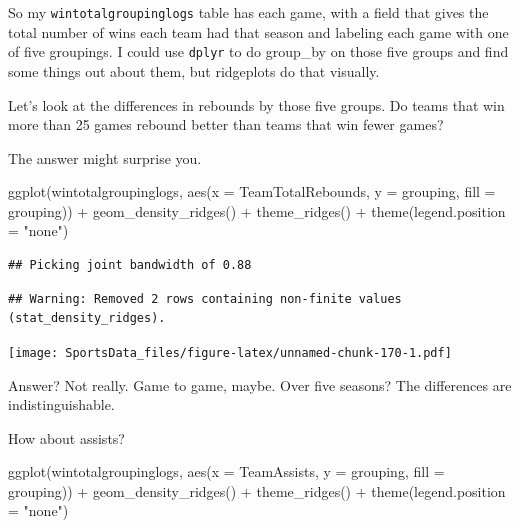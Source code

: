 \documentclass[
]{book}
\newenvironment{Shaded}{\begin{snugshade}}{\end{snugshade}}
\newcommand{\AttributeTok}[1]{\textcolor[rgb]{0.77,0.63,0.00}{#1}}
\newcommand{\FunctionTok}[1]{\textcolor[rgb]{0.00,0.00,0.00}{#1}}
\newcommand{\NormalTok}[1]{#1}
\newcommand{\SpecialCharTok}[1]{\textcolor[rgb]{0.00,0.00,0.00}{#1}}
\newcommand{\StringTok}[1]{\textcolor[rgb]{0.31,0.60,0.02}{#1}}
\begin{document}
So my \texttt{wintotalgroupinglogs} table has each game, with a field that gives the total number of wins each team had that season and labeling each game with one of five groupings. I could use \texttt{dplyr} to do group\_by on those five groups and find some things out about them, but ridgeplots do that visually.

Let's look at the differences in rebounds by those five groups. Do teams that win more than 25 games rebound better than teams that win fewer games?

The answer might surprise you.

\begin{Shaded}
\begin{Highlighting}[]
\FunctionTok{ggplot}\NormalTok{(wintotalgroupinglogs, }\FunctionTok{aes}\NormalTok{(}\AttributeTok{x =}\NormalTok{ TeamTotalRebounds, }\AttributeTok{y =}\NormalTok{ grouping, }\AttributeTok{fill =}\NormalTok{ grouping)) }\SpecialCharTok{+}
  \FunctionTok{geom\_density\_ridges}\NormalTok{() }\SpecialCharTok{+}
  \FunctionTok{theme\_ridges}\NormalTok{() }\SpecialCharTok{+} 
  \FunctionTok{theme}\NormalTok{(}\AttributeTok{legend.position =} \StringTok{"none"}\NormalTok{)}
\end{Highlighting}
\end{Shaded}

\begin{verbatim}
## Picking joint bandwidth of 0.88
\end{verbatim}

\begin{verbatim}
## Warning: Removed 2 rows containing non-finite values (stat_density_ridges).
\end{verbatim}

\texttt{[image: SportsData\_files/figure-latex/unnamed-chunk-170-1.pdf]}

Answer? Not really. Game to game, maybe. Over five seasons? The differences are indistinguishable.

How about assists?

\begin{Shaded}
\begin{Highlighting}[]
\FunctionTok{ggplot}\NormalTok{(wintotalgroupinglogs, }\FunctionTok{aes}\NormalTok{(}\AttributeTok{x =}\NormalTok{ TeamAssists, }\AttributeTok{y =}\NormalTok{ grouping, }\AttributeTok{fill =}\NormalTok{ grouping)) }\SpecialCharTok{+}
  \FunctionTok{geom\_density\_ridges}\NormalTok{() }\SpecialCharTok{+}
  \FunctionTok{theme\_ridges}\NormalTok{() }\SpecialCharTok{+} 
  \FunctionTok{theme}\NormalTok{(}\AttributeTok{legend.position =} \StringTok{"none"}\NormalTok{)}
\end{Highlighting}
\end{Shaded}
\end{document}
